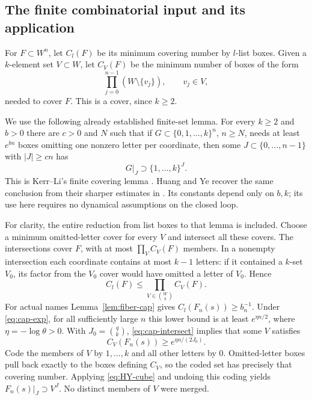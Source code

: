 \documentclass[11pt,reqno]{amsart}
\numberwithin{equation}{section}
\theoremstyle{definition}
\begin{document}
\subsection{The finite combinatorial input and its application}
For $F\subset W^n$, let $C_l(F)$ be its minimum covering number by
$l$-list boxes. Given a $k$-element set $V\subset W$, let $C_V(F)$
be the minimum number of boxes of the form
\[
 \prod_{j=0}^{n-1}(W\setminus\{v_j\}),\qquad v_j\in V,
\]
needed to cover $F$. This is a cover, since $k\ge2$.

We use the following already established finite-set lemma. For every
$k\ge2$ and $b>0$ there are $c>0$ and $N$ such that if
$G\subset\{0,1,\ldots,k\}^n$, $n\ge N$, needs at least
$e^{bn}$ boxes omitting one nonzero letter per coordinate, then some
$J\subset\{0,\ldots,n-1\}$ with $|J|\ge cn$ has
\begin{equation}\label{eq:HY-cube}
 G|_J\supset\{1,\ldots,k\}^{J}.
\end{equation}
This is Kerr--Li's finite covering lemma
\cite[Lemma~3.3]{KL2007}. Huang and Ye recover the same conclusion
from their sharper estimates in \cite[Lemma~4.1 and Remark~4.2,
pp.~1701--1705]{HuangYe2009}. Its constants depend only on $b,k$;
its use here requires no dynamical assumptions on the closed loop.

For clarity, the entire reduction from list boxes to that lemma is
included. Choose a minimum omitted-letter cover for every $V$ and
intersect all these covers. The intersections cover $F$, with at most
$\prod_V C_V(F)$ members. In a nonempty intersection each coordinate
contains at most $k-1$ letters: if it contained a $k$-set $V_0$, its
factor from the $V_0$ cover would have omitted a letter of $V_0$.
Hence
\begin{equation}\label{eq:cap-intersect}
 C_l(F)\le\prod_{V\in\binom Wk}C_V(F).
\end{equation}
For actual names Lemma~\ref{lem:fiber-cap} gives
$C_l(F_n(s))\ge b_n^{-1}$. Under \eqref{eq:cap-exp}, for all
sufficiently large $n$ this lower bound is at least
$e^{\eta n/2}$, where $\eta=-\log\theta>0$. With
$J_0=\binom qk$, \eqref{eq:cap-intersect} implies that some $V$
satisfies
\[
 C_V(F_n(s))\ge e^{\eta n/(2J_0)}.
\]
Code the members of $V$ by $1,\ldots,k$ and all other letters by
$0$. Omitted-letter boxes pull back exactly to the boxes defining
$C_V$, so the coded set has precisely that covering number. Applying
\eqref{eq:HY-cube} and undoing this coding yields
$F_n(s)|_J\supset V^J$. No distinct members of $V$ were merged.
\end{document}
